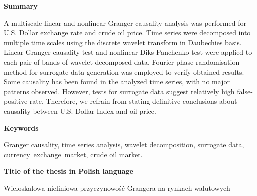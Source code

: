 \newpage
\begin{center}
\textbf{Summary}
\end{center}

A multiscale linear and nonlinear Granger causality analysis was performed for U.S. Dollar exchange rate and crude oil price.
Time series were decomposed into multiple time scales using the discrete wavelet transform in Daubechies basis.
Linear Granger causality test and nonlinear Diks-Panchenko test were applied to each pair of bands of wavelet decomposed data.
Fourier phase randomisation method for surrogate data generation was employed to verify obtained results.
Some causality has been found in the analyzed time series, with no major patterns observed.
However, tests for surrogate data suggest relatively high false-positive rate.
Therefore, we refrain from stating definitive conclusions about causality between U.S. Dollar Index and oil price.
\vspace{2.5cm}
\begin{center}

\textbf{Keywords}\vspace{0.3cm}

Granger causality, time series analysis, wavelet decomposition, surrogate data, \mbox{currency exchange market}, crude oil market.\\
\vspace{2.5cm}

\textbf{Title of the thesis in Polish language}\vspace{0.3cm}

Wieloskalowa nieliniowa przyczynowość Grangera na rynkach walutowych
\end{center}

